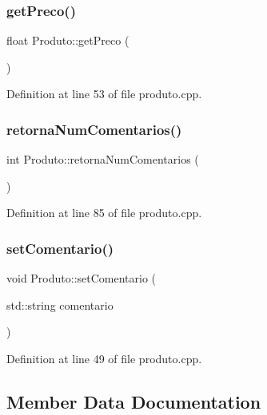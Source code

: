 \subsubsection{\texorpdfstring{get\+Preco()}{getPreco()}}
{\footnotesize\ttfamily float Produto\+::get\+Preco (\begin{DoxyParamCaption}{ }\end{DoxyParamCaption})}



Definition at line 53 of file produto.\+cpp.

\mbox{\label{class_produto_aad630dde537191383c0140c91f74f9ed}} 
\subsubsection{\texorpdfstring{retorna\+Num\+Comentarios()}{retornaNumComentarios()}}
{\footnotesize\ttfamily int Produto\+::retorna\+Num\+Comentarios (\begin{DoxyParamCaption}{ }\end{DoxyParamCaption})}



Definition at line 85 of file produto.\+cpp.

\mbox{\label{class_produto_a36bac4cf6ea3bab2f16ef4e9ae3c8f77}} 
\subsubsection{\texorpdfstring{set\+Comentario()}{setComentario()}}
{\footnotesize\ttfamily void Produto\+::set\+Comentario (\begin{DoxyParamCaption}\item[{std\+::string}]{comentario }\end{DoxyParamCaption})}



Definition at line 49 of file produto.\+cpp.



\subsection{Member Data Documentation}
\mbox{\label{class_produto_a72be5ef0141a079e03c2b0d65d3f331d}} 

